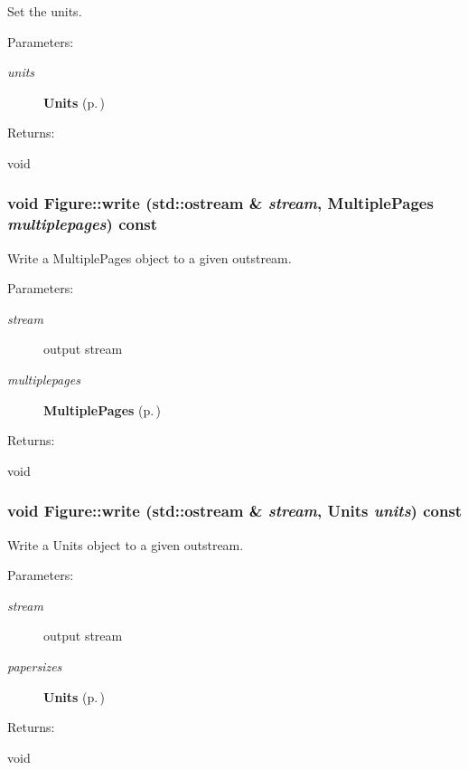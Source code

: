 Set the units. \begin{Desc}
\item[Parameters: ]\par
\begin{description}
\item[{\em 
units}]{\bf Units} {\rm (p.\,\pageref{classFigure_s25})} \end{description}
\end{Desc}
\begin{Desc}
\item[Returns: ]\par
void \end{Desc}
\subsubsection{\setlength{\rightskip}{0pt plus 5cm}void Figure::write (std::ostream \& {\em stream}, {\bf Multiple\-Pages} {\em multiplepages}) const}\label{classFigure_a25}


Write a Multiple\-Pages object to a given outstream. \begin{Desc}
\item[Parameters: ]\par
\begin{description}
\item[{\em 
stream}]output stream \item[{\em 
multiplepages}]{\bf Multiple\-Pages} {\rm (p.\,\pageref{classFigure_s27})} \end{description}
\end{Desc}
\begin{Desc}
\item[Returns: ]\par
void \end{Desc}
\subsubsection{\setlength{\rightskip}{0pt plus 5cm}void Figure::write (std::ostream \& {\em stream}, {\bf Units} {\em units}) const}\label{classFigure_a24}


Write a Units object to a given outstream. \begin{Desc}
\item[Parameters: ]\par
\begin{description}
\item[{\em 
stream}]output stream \item[{\em 
papersizes}]{\bf Units} {\rm (p.\,\pageref{classFigure_s25})} \end{description}
\end{Desc}
\begin{Desc}
\item[Returns: ]\par
void \end{Desc}
